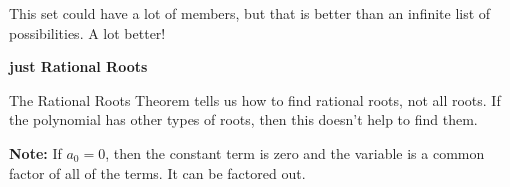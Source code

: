 \documentclass{ximera}
\begin{document}
This set could have a lot of members, but that is better than an infinite list of possibilities.  A lot better! 


\begin{warning} \textbf{\textcolor{red!80!black}{just Rational Roots}} 


The Rational Roots Theorem tells us how to find rational roots, not all roots.  If the polynomial has other types of roots, then this doesn't help to find them.


\end{warning}

\textbf{Note:} If $a_0 = 0$, then the constant term is zero and the variable is a common factor of all of the terms.  It can be factored out.
\end{document}
